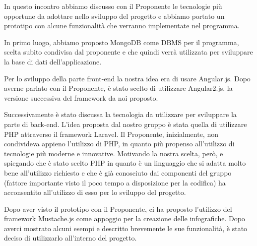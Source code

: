 In questo incontro abbiamo discusso con il Proponente le tecnologie più opportune da adottare nello sviluppo del progetto e abbiamo portato un prototipo con alcune funzionalità che verranno implementate nel programma.

\noindent In primo luogo, abbiamo proposto MongoDB come DBMS per il programma, scelta subito condivisa dal proponente e che quindi verrà utilizzata per sviluppare la base di dati dell'applicazione.

\noindent Per lo sviluppo della parte front-end la nostra idea era di usare Angular.js. Dopo averne parlato con il Proponente, è stato scelto di utilizzare Angular2.js, la versione successiva del framework da noi proposto.

\noindent Successivamente è stato discussa la tecnologia da utilizzare per sviluppare la parte di back-end. L'idea proposta dal nostro gruppo è stata quella di utilizzare PHP attraverso il framework Laravel. Il Proponente, inizialmente, non condivideva appieno l'utilizzo di PHP, in quanto più propenso all'utilizzo di tecnologie più moderne e innovative. Motivando la nostra scelta, però, e spiegando che è stato scelto PHP in quanto è un linguaggio che si adatta molto bene all'utilizzo richiesto e che è già conosciuto dai componenti del gruppo (fattore importante visto il poco tempo a disposizione per la codifica) ha acconsentito all'utilizzo di esso per lo sviluppo del progetto.

\noindent Dopo aver visto il prototipo con il Proponente, ci ha proposto l'utilizzo del framework Mustache.js come appoggio per la creazione delle infografiche. Dopo averci mostrato alcuni esempi e descritto brevemente le sue funzionalità, è stato deciso di utilizzarlo all'interno del progetto.